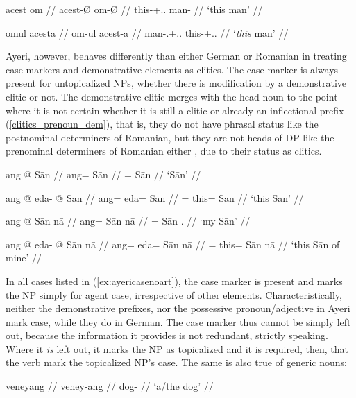 \pex
	\a {}%
	\begingl
		\gla acest om //
		\glb acest-Ø om-Ø //
		\glc this-\Nom{}+\Acc{}.\Sg{}.\M{} man-\Sg{} //
		\glft `this man' //
	\endgl

	\a \begingl
		\gla omul acesta //
		\glb om-ul acest-a //
		\glc man-\Def{}.\Nom{}+\Acc{}.\Sg{}.\M{} 
			this-\Nom{}+\Acc{}.\Sg{}.\M{} //
		\glft `\emph{this} man' //
	\endgl
\xe

Ayeri, however, behaves differently than either German or Romanian in treating
case markers and demonstrative elements as clitics. The case marker is always
present for untopicalized NPs, whether there is modification by a demonstrative
clitic or not. The demonstrative clitic merges with the head noun to the point
where it is not certain whether it is still a clitic or already an inflectional
prefix (\autoref{clitics_prenoun_dem}), that is, they do not have phrasal
status like the postnominal determiners of Romanian, but they are not heads of
DP like the prenominal determiners of Romanian either 
\citep[299]{dindelegan2013}, due to their status as clitics.

\pex\label{ex:ayericasenoart}
	\a
	\begingl
		\gla ang @ Sān //
		\glb ang= Sān //
		\glc \Aarg{}= Sān //
		\glft `Sān' //
	\endgl

	\a\begingl
		\gla ang @ eda- @ Sān //
		\glb ang= eda= Sān //
		\glc \Aarg{}= this= Sān //
		\glft `this Sān' //
	\endgl

	\a\label{ex:naaadj}\begingl
		\gla ang @ Sān nā //
		\glb ang= Sān nā //
		\glc \Aarg{}= Sān \Fsg{}.\Gen{} //
		\glft `my Sān' //
	\endgl

	\a\ljudge\ques\begingl
		\gla ang @ eda- @ Sān nā //
		\glb ang= eda= Sān nā //
		\glc \Aarg{}= this= Sān nā //
		\glft `this Sān of mine' //
	\endgl
\xe

In all cases listed in (\ref{ex:ayericasenoart}), the case marker is present
and marks the NP simply for agent case, irrespective of other elements.
Characteristically, neither the demonstrative prefixes, nor the possessive
pronoun/adjective in Ayeri mark case, while they do in German. The case marker
thus cannot be simply left out, because the information it provides is not
redundant, strictly speaking. Where it \emph{is} left out, it marks the NP as
topicalized and it is required, then, that the verb mark the topicalized NP's
case. The same is also true of generic nouns:

\pex
	\a
	\begingl
		\gla veneyang //
		\glb veney-ang //
		\glc dog-\Aarg{} //
		\glft `a/the dog' //
	\endgl


